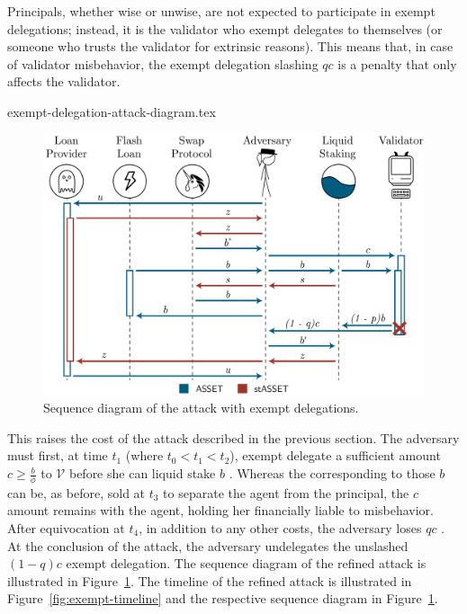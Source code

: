 Principals, whether wise or unwise, are not expected to participate in exempt
delegations; instead, it is the validator who exempt delegates to
themselves (or someone who trusts the validator for extrinsic reasons).
This means that, in case of validator misbehavior, the exempt delegation
slashing $qc$ is a penalty that only affects the validator.

\iflncs
  \ifproceedings
  \else
    {exempt-delegation-attack-diagram.tex}
  \fi
\fi

\ifproceedings
  \iflncs
    \begin{figure}[htb]
      \centering
      \includegraphics[width=1\textwidth]{./figures/sequence-diagram.pdf}
      \caption{Sequence diagram of the attack with exempt delegations.}
      \label{fig:exempt-sequence}
    \end{figure}
  \fi
\else
\fi

This raises
the cost of the attack described in the previous section. The
adversary must first, at time $t_1$ (where $t_0 < t_1 < t_2$), exempt delegate a sufficient amount
$c \geq \frac{b}{\phi}$ \asset to $\mathcal{V}$ before she can liquid stake $b$ \asset.
Whereas the \stassets
corresponding to those $b$ \assets can be, as before, sold at $t_3$ to
separate the agent from the principal, the $c$ amount remains with the
agent, holding her financially liable to misbehavior. After equivocation at $t_4$,
in addition to any other costs, the adversary loses $qc$ \asset. At the conclusion
of the attack, the adversary undelegates the unslashed $(1 - q)c$ \asset exempt delegation.
\ifproceedings
  The sequence diagram of the refined attack is illustrated in Figure~\ref{fig:exempt-sequence}.
\else
  The timeline of the refined attack is illustrated in Figure~\ref{fig:exempt-timeline}
  and the respective sequence diagram in Figure~\ref{fig:exempt-sequence}.
\fi


